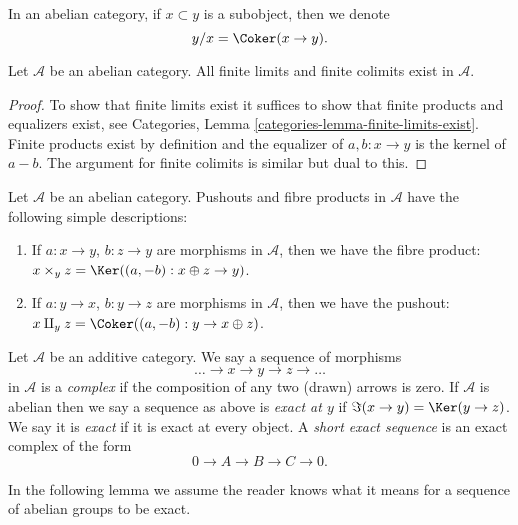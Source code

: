 \noindent
In an abelian category, if $x \subset y$ is a subobject,
then we denote
$$
y/x = \Coker(x \to y).
$$

\begin{lemma}
\label{lemma-colimit-abelian-category}
Let $\mathcal{A}$ be an abelian category.
All finite limits and finite colimits exist in $\mathcal{A}$.
\end{lemma}

\begin{proof}
To show that finite limits exist it suffices to show
that finite products and equalizers exist, see
Categories, Lemma \ref{categories-lemma-finite-limits-exist}.
Finite products exist
by definition and the equalizer of $a, b : x \to y$ is
the kernel of $a - b$. The argument for finite colimits
is similar but dual to this.
\end{proof}

\begin{example}
\label{example-fibre-product-pushouts}
Let $\mathcal{A}$ be an abelian category.
Pushouts and fibre products in $\mathcal{A}$ have the following
simple descriptions:
\begin{enumerate}
\item If $a : x \to y$, $b : z \to y$ are morphisms in $\mathcal{A}$, then
we have the fibre product:
$x \times_y z = \Ker((a, -b) : x \oplus z \to y)$.
\item If $a : y \to x$, $b : y \to z$ are morphisms in $\mathcal{A}$, then
we have the pushout:
$x \amalg_y z = \Coker((a, -b) : y \to x \oplus z)$.
\end{enumerate}
\end{example}

\begin{definition}
\label{definition-exact}
Let $\mathcal{A}$ be an additive category.
We say a sequence of morphisms
$$
\ldots \to x \to y \to z \to \ldots
$$
in $\mathcal{A}$
is a {\it complex} if the composition of any two (drawn)
arrows is zero. If $\mathcal{A}$ is abelian then
we say a sequence as above is {\it exact at $y$} if
$\Im(x \to y) = \Ker(y \to z)$. We say it is {\it exact}
if it is exact at every object. A {\it short exact sequence}
is an exact complex of the form
$$
0 \to A  \to B \to C \to 0.
$$
\end{definition}

\noindent
In the following lemma we assume the reader knows what it means
for a sequence of abelian groups to be exact.

